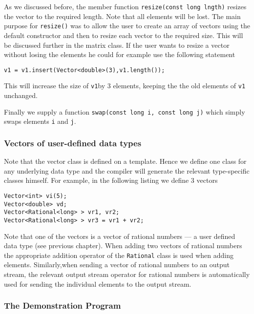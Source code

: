 As we discussed before, the member function \verb+resize(const long lngth)+
resizes the vector to the required length. Note that all elements will be
lost. The main purpose for \verb+resize()+ was to allow the user to
create an array of vectors using the default constructor and then to
resize each vector to the required size. This will be discussed further
in the matrix class. If the user wants to resize a vector without losing
the elements he could for example use the following statement
{\footnotesize \begin{verbatim}
v1 = v1.insert(Vector<double>(3),v1.length());
\end{verbatim}}
This will increase the size of \verb+v1+by 3 elements, keeping the
the old elements of \verb+v1+ unchanged.

Finally we supply a function \verb+swap(const long i, const long j)+
which simply swaps elements \verb+i+ and \verb+j+.


\subsubsection{Vectors of user-defined data types}

Note that the vector class is defined on a template. Hence we define
one class for any underlying data type and the compiler will generate 
the relevant type-specific classes himself. For example, in the following
listing we define 3 vectors
{\footnotesize \begin{verbatim}
Vector<int> vi(5);
Vector<double> vd;
Vector<Rational<long> > vr1, vr2;
Vector<Rational<long> > vr3 = vr1 + vr2;
\end{verbatim}}

Note that one of the vectors is a vector of rational numbers --- a user 
defined data type (see previous chapter). When adding two vectors
of rational numbers the appropriate addition operator of the \verb+Rational+
class is used when adding elements. Similarly,when sending a vector of
rational numbers to an output stream, the relevant output stream operator 
for rational numbers is automatically used for sending the individual elements
to the output stream.


\subsubsection{The Demonstration Program}

